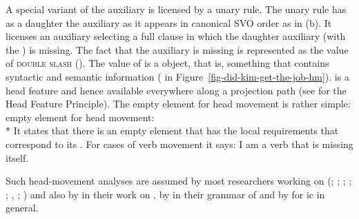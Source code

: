 \documentclass[output=paper
                ,modfonts
                ,nonflat
	        ,collection
	        ,collectionchapter
	        ,collectiontoclongg
 	        ,biblatex
                ,babelshorthands
                ,newtxmath
                ,draftmode
                ,colorlinks, citecolor=brown
]{./langsci/langscibook}
\begin{document}
A special variant of the auxiliary is licensed by a unary rule. The unary rule has as a daughter the auxiliary as
it appears in canonical SVO order as in (b). It licenses an auxiliary selecting a full clause
in which the daughter auxiliary (with the \locv {}) is missing. The fact
that the auxiliary is missing is represented as the value of \textsc{double slash} (\dsl). The value of \dsl is a
 object, that is, something that contains syntactic and semantic information (
in Figure~\ref{fig-did-kim-get-the-job-hm}). \dsl is a head feature and hence available everywhere
along a projection path (see  for the Head Feature
Principle). The empty element for
head movement is rather simple:
\ea
empty element for head movement:\\*
\z
It states that there is an empty element that has the local requirements that correspond to its
\dslv. For cases of verb movement it says: I am a verb that is missing itself. 

Such head-movement analyses are assumed by most
researchers working on  (\citealp*[Section~4.7]{KW91a}; \citealp{Oliva92a}; \citealp*{Netter92};   
\citealp*{Frank94}; \citealp*[Section~2.2.4.2]{Kiss95a}; \citealp[Section~3.1.1.1]{Feldhaus97},
\citealp[Section~5.1]{Meurers2000b}; \citealp{Mueller2005c,MuellerGS}) and also by \citet[,
  71]{BvN98a} in their work on , by \citet{MOeDanish} in their grammar of
 and by \citet{MuellerGermanic} for ic in general.
\end{document}
